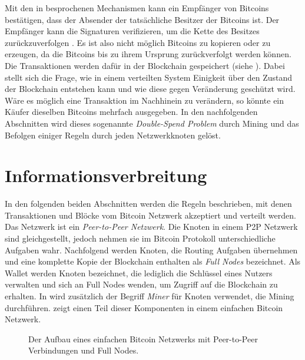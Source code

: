 \documentclass[ngerman,runningheads,a4paper]{llncs}[2018/03/10]
\begin{document}
Mit den in  besprochenen Mechanismen kann ein Empfänger von Bitcoins bestätigen, dass der Absender der tatsächliche Besitzer der Bitcoins ist. Der Empfänger kann die Signaturen verifizieren, um die Kette des Besitzes zurückzuverfolgen \citep{bitcoinPDF}. Es ist also nicht möglich Bitcoins zu kopieren oder zu erzeugen, da die Bitcoins bis zu ihrem Ursprung zurückverfolgt werden können. Die Transaktionen werden dafür in der Blockchain gespeichert (siehe ). Dabei stellt sich die Frage, wie in einem verteilten System Einigkeit über den Zustand der Blockchain entstehen kann und wie diese gegen Veränderung geschützt wird. Wäre es möglich eine Transaktion im Nachhinein zu verändern, so könnte ein Käufer dieselben Bitcoins mehrfach ausgegeben. In den nachfolgenden Abschnitten wird dieses sogenannte \textit{Double-Spend Problem} durch Mining und das Befolgen einiger Regeln durch jeden Netzwerkknoten gelöst.


\section{Informationsverbreitung}\label{sec:informationsverbreitung}

In den folgenden beiden Abschnitten werden die Regeln beschrieben, mit denen Transaktionen und Blöcke vom Bitcoin Netzwerk akzeptiert und verteilt werden. Das Netzwerk ist ein \textit{Peer-to-Peer Netzwerk}. Die Knoten in einem P2P Netzwerk sind gleichgestellt, jedoch nehmen sie im Bitcoin Protokoll unterschiedliche Aufgaben wahr. Nachfolgend werden Knoten, die Routing Aufgaben übernehmen und eine komplette Kopie der Blockchain enthalten als \textit{Full Nodes} bezeichnet. Als Wallet werden Knoten bezeichnet, die lediglich die Schlüssel eines Nutzers verwalten und sich an Full Nodes wenden, um Zugriff auf die Blockchain zu erhalten. In  wird zusätzlich der Begriff \textit{Miner} für Knoten verwendet, die Mining durchführen.  zeigt einen Teil dieser Komponenten in einem einfachen Bitcoin Netzwerk. 

\begin{figure}
  \centering
  \caption{Der Aufbau eines einfachen Bitcoin Netzwerks mit Peer-to-Peer Verbindungen und Full Nodes.}
  \label{fig:basicNetwork}
\end{figure}
\end{document}

